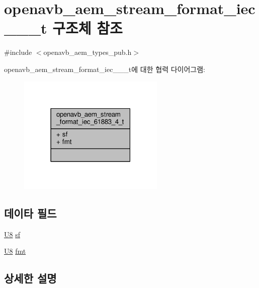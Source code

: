 \hypertarget{structopenavb__aem__stream__format__iec__61883__4__t}{}\section{openavb\+\_\+aem\+\_\+stream\+\_\+format\+\_\+iec\+\_\+\_\+\_\+t 구조체 참조}
\label{structopenavb__aem__stream__format__iec__61883__4__t}


{\ttfamily \#include $<$openavb\+\_\+aem\+\_\+types\+\_\+pub.\+h$>$}



openavb\+\_\+aem\+\_\+stream\+\_\+format\+\_\+iec\+\_\+\_\+\_\+t에 대한 협력 다이어그램\+:
\nopagebreak
\begin{figure}[H]
\begin{center}
\leavevmode
\includegraphics[width=198pt]{structopenavb__aem__stream__format__iec__61883__4__t__coll__graph}
\end{center}
\end{figure}
\subsection*{데이타 필드}
\begin{DoxyCompactItemize}
\item 
\hyperlink{openavb__types__base__pub_8h_aa63ef7b996d5487ce35a5a66601f3e73}{U8} \hyperlink{structopenavb__aem__stream__format__iec__61883__4__t_a153db177c2b7653917dff143e5f755e1}{sf}
\item 
\hyperlink{openavb__types__base__pub_8h_aa63ef7b996d5487ce35a5a66601f3e73}{U8} \hyperlink{structopenavb__aem__stream__format__iec__61883__4__t_ab88030d1822b822615cede2168f1c31e}{fmt}
\end{DoxyCompactItemize}


\subsection{상세한 설명}


